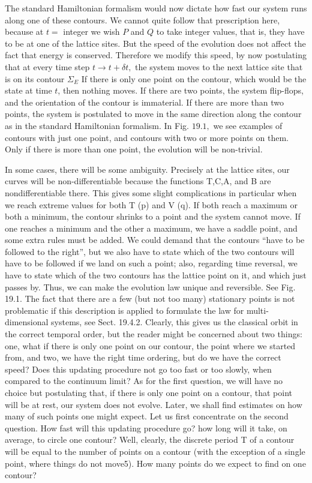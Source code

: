 \documentclass[main.tex]{subfiles}
\begin{document}
The standard Hamiltonian formalism would now dictate how fast our system runs along one of these contours. We cannot quite follow that prescription here, because at $t=$ integer we wish $P$ and $Q$ to take integer values, that is, they have to be at one of the lattice sites. But the speed of the evolution does not affect the fact that energy is conserved. Therefore we modify this speed, by now postulating that
at every time step $t \rightarrow t+\delta t,$ the system moves to the next lattice site that is
on its contour $\Sigma_{E}$
If there is only one point on the contour, which would be the state at time $t$, then nothing moves. If there are two points, the system flip-flops, and the orientation of the contour is immaterial. If there are more than two points, the system is postulated to move in the same direction along the contour as in the standard Hamiltonian formalism. In Fig. $19.1,$ we see examples of contours with just one point, and contours with two or more points on them. Only if there is more than one point, the evolution
will be non-trivial.

In some cases, there will be some ambiguity. Precisely at the lattice sites, our
curves will be non-differentiable because the functions T,C,A, and B are nondifferentiable
there. This gives some slight complications in particular when we
reach extreme values for both T (p) and V (q). If both reach a maximum or both a
minimum, the contour shrinks to a point and the system cannot move. If one reaches
a minimum and the other a maximum, we have a saddle point, and some extra rules
must be added. We could demand that the contours “have to be followed to the
right”, but we also have to state which of the two contours will have to be followed
if we land on such a point; also, regarding time reversal, we have to state which of
the two contours has the lattice point on it, and which just passes by. Thus, we can
make the evolution law unique and reversible. See Fig. 19.1. The fact that there are
a few (but not too many) stationary points is not problematic if this description is
applied to formulate the law for multi-dimensional systems, see Sect. 19.4.2.
Clearly, this gives us the classical orbit in the correct temporal order, but the
reader might be concerned about two things: one, what if there is only one point on our contour, the point where we started from, and two, we have the right time
ordering, but do we have the correct speed? Does this updating procedure not go too
fast or too slowly, when compared to the continuum limit?
As for the first question, we will have no choice but postulating that, if there is
only one point on a contour, that point will be at rest, our system does not evolve.
Later, we shall find estimates on how many of such points one might expect.
Let us first concentrate on the second question. How fast will this updating procedure
go? how long will it take, on average, to circle one contour? Well, clearly,
the discrete period T of a contour will be equal to the number of points on a contour
(with the exception of a single point, where things do not move5). How many points
do we expect to find on one contour?
\end{document}
